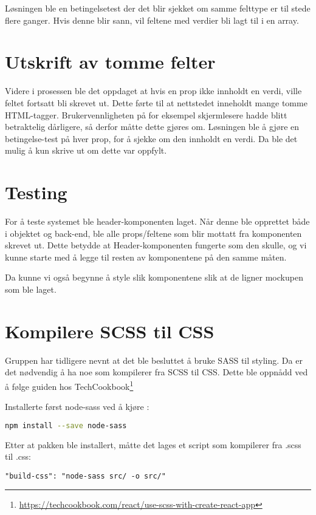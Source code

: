 Løsningen ble en betingelsetest der det blir sjekket om samme felttype er til stede flere ganger. Hvis denne blir sann, vil feltene med verdier bli lagt til i en array. 

\section{Utskrift av tomme felter}
Videre i prosessen ble det oppdaget at hvis en prop ikke innholdt en verdi, ville feltet fortsatt bli skrevet ut. Dette førte til at nettstedet inneholdt mange tomme HTML-tagger. Brukervennligheten på for eksempel skjermlesere hadde blitt betraktelig dårligere, så derfor måtte dette gjøres om. Løsningen ble å gjøre en betingelse-test på hver prop, for å sjekke om den innholdt en verdi. Da ble det mulig å kun skrive ut om dette var oppfylt.

\section{Testing}
For å teste systemet ble header-komponenten laget. Når denne ble opprettet både i objektet og back-end, ble alle props/feltene som blir mottatt fra komponenten skrevet ut. Dette betydde at Header-komponenten fungerte som den skulle, og vi kunne starte med å legge til resten av komponentene på den samme måten. 

Da kunne vi også begynne å style slik komponentene slik at de ligner mockupen som ble laget.

\section{Kompilere SCSS til CSS}
Gruppen har tidligere nevnt at det ble besluttet å bruke SASS til styling. Da er det nødvendig å ha noe som kompilerer fra SCSS til CSS. Dette ble oppnådd ved å følge guiden hos TechCookbook\footnote{\url{https://techcookbook.com/react/use-scss-with-create-react-app}}

Installerte først node-sass ved å kjøre :

\begin{lstlisting}[caption={Installering av node-sass},language=bash]
npm install --save node-sass
\end{lstlisting}

Etter at pakken ble installert, måtte det lages et script som kompilerer fra .scss til .css:

\begin{lstlisting}[caption={Kompliering fra .scss til .css}]
 "build-css": "node-sass src/ -o src/"
\end{lstlisting}
\clearpage

